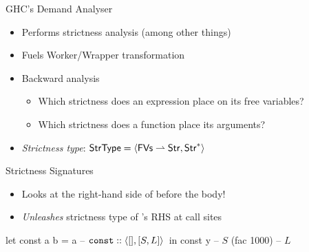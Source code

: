 \documentclass{haskellbeamer}
\begin{document}
\begin{frame}[fragile]{GHC's Demand Analyser}
  \begin{itemize}
    \item Performs strictness analysis (among other things)
    \item Fuels Worker/Wrapper transformation
    \item Backward analysis
      \begin{itemize}
        \item Which strictness does an expression place on its free variables?
        \item Which strictness does a function place its arguments?
      \end{itemize}
    \item \emph{Strictness type}: $\text{\textsf{StrType}} = \left\langle{}\text{\textsf{FVs}} \rightharpoonup \text{\textsf{Str}},\text{\textsf{Str}}^*\right\rangle{}$
  \end{itemize}
\end{frame}

\begin{frame}[fragile]{Strictness Signatures}
  \begin{itemize}
    \item Looks at the right-hand side of  before the  body!
    \item \emph{Unleashes} strictness type of 's RHS at call sites
  \end{itemize}
  \begin{center}
    \begin{minipage}{0.8\textwidth}
      \begin{haskell}
        let const a b = a -- $\mathtt{const} :: \left\langle{}[],[S, L]\right\rangle{}$
        in const 
            y             -- $S$
            (fac 1000)    -- $L$
      \end{haskell}
    \end{minipage}
  \end{center}
\end{frame}
\end{document}

